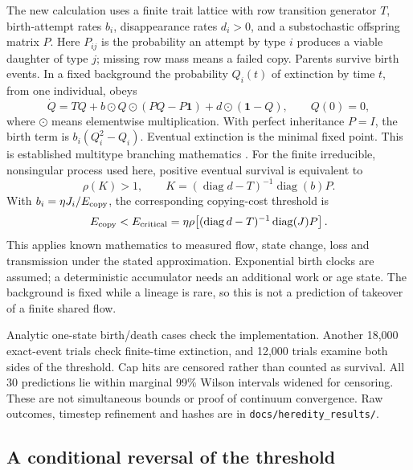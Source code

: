 The new calculation uses a finite trait lattice with row transition generator
$T$, birth-attempt rates $b_i$, disappearance rates $d_i>0$, and a substochastic
offspring matrix $P$. Here $P_{ij}$ is the probability an attempt by type $i$
produces a viable daughter of type $j$; missing row mass means a failed copy.
Parents survive birth events. In a fixed background the probability $Q_i(t)$ of
extinction by time $t$, from one individual, obeys
\begin{equation}
 \dot Q=TQ+b\mathbin{\odot}Q\mathbin{\odot}(PQ-P\mathbf1)
              +d\mathbin{\odot}(\mathbf1-Q),\qquad Q(0)=0,
\end{equation}
where $\odot$ means elementwise multiplication. With perfect inheritance $P=I$,
the birth term is $b_i(Q_i^2-Q_i)$. Eventual extinction is the minimal fixed point.
This is established multitype branching mathematics \cite{branching}. For the
finite irreducible, nonsingular process used here, positive eventual survival is
equivalent to
\begin{equation}
 \rho(K)>1,\qquad K=(\operatorname{diag}d-T)^{-1}\operatorname{diag}(b)P.
\end{equation}
With $b_i=\eta J_i/E_{\rm copy}$, the corresponding copying-cost threshold is
\begin{equation}
 E_{\rm copy}<E_{\rm critical}
 =\eta\rho\!\left[(\operatorname{diag}d-T)^{-1}\operatorname{diag}(J)P\right].
\end{equation}
This applies known mathematics to measured flow, state change, loss and
transmission under the stated approximation. Exponential birth clocks are
assumed; a deterministic accumulator needs an additional work or age state.
The background is fixed while a lineage is rare, so this is not a prediction of
takeover of a finite shared flow.

Analytic one-state birth/death cases check the implementation. Another 18,000
exact-event trials check finite-time extinction, and 12,000 trials examine both
sides of the threshold. Cap hits are censored rather than counted as survival.
All 30 predictions lie within marginal 99\% Wilson intervals widened for
censoring. These are not simultaneous bounds or proof of continuum convergence.
Raw outcomes, timestep refinement and hashes are in \texttt{docs/heredity\_results/}.

\subsection{A conditional reversal of the threshold}

